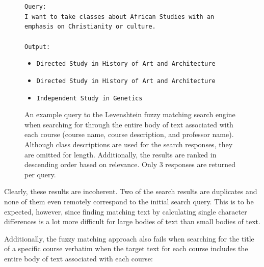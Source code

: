 \documentclass[
	a4paper, %
	10pt, %
	unnumberedsections, %
	twoside, %
]{LTJournalArticle}
\begin{document}
\begin{figure}[h]
	\begin{center}
		\texttt{Query:} \\
		\texttt{I want to take classes about African Studies with an emphasis on Christianity or culture.} \\
		\texttt{}\\
		\texttt{Output:} 
		\begin{itemize}
			\item \texttt{Directed Study in History of Art and Architecture}
			\item \texttt{Directed Study in History of Art and Architecture}
			\item \texttt{Independent Study in Genetics}
		\end{itemize}		
	\end{center}
	\caption{An example query to the Levenshtein fuzzy matching search engine when searching for through the entire body of text associated with each course (course name, course description, and professor name). Although class descriptions are used for the search responses, they are omitted for length. Additionally, the results are ranked in descending order based on relevance. Only 3 responses are returned per query.}
\end{figure}

Clearly, these results are incoherent. Two of the search results are duplicates and none of them even remotely correspond to the initial search query. This is to be expected, however, since finding matching text by calculating single character differences is a lot more difficult for large bodies of text than small bodies of text. 

Additionally, the fuzzy matching approach also fails when searching for the title of a specific course verbatim when the target text for each course includes the entire body of text associated with each course:

\enter

\enter
\end{document}
